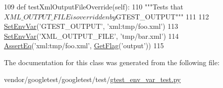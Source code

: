 \begin{DoxyCode}
109   \textcolor{keyword}{def }testXmlOutputFileOverride(self):
110     \textcolor{stringliteral}{"""Tests that $XML\_OUTPUT\_FILE is overridden by $GTEST\_OUTPUT"""}
111 
112     \hyperlink{namespacegtest__catch__exceptions__test_a60be14c2b88aafb689ba4d3d2578449e}{SetEnvVar}(\textcolor{stringliteral}{'GTEST\_OUTPUT'}, \textcolor{stringliteral}{'xml:tmp/foo.xml'})
113     \hyperlink{namespacegtest__catch__exceptions__test_a60be14c2b88aafb689ba4d3d2578449e}{SetEnvVar}(\textcolor{stringliteral}{'XML\_OUTPUT\_FILE'}, \textcolor{stringliteral}{'tmp/bar.xml'})
114     \hyperlink{namespacegtest__env__var__test_a8c94a5abd1117cdd2b402c0059a49a3a}{AssertEq}(\textcolor{stringliteral}{'xml:tmp/foo.xml'}, \hyperlink{namespacegtest__env__var__test_a79d5f78f47c7dde37a0941d8604cf857}{GetFlag}(\textcolor{stringliteral}{'output'}))
115 
\end{DoxyCode}


The documentation for this class was generated from the following file\+:\begin{DoxyCompactItemize}
\item 
vendor/googletest/googletest/test/\hyperlink{gtest__env__var__test_8py}{gtest\+\_\+env\+\_\+var\+\_\+test.\+py}\end{DoxyCompactItemize}
